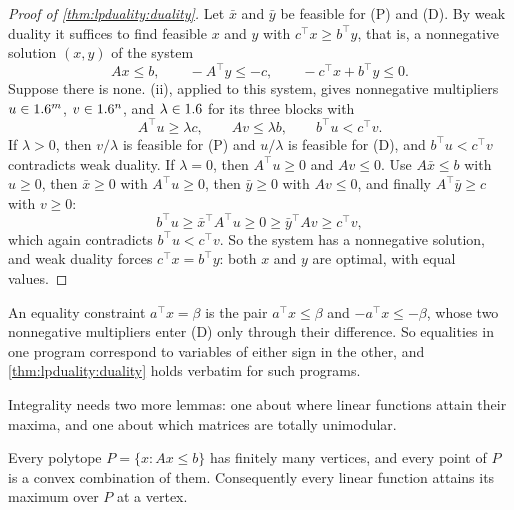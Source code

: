 \begin{refsection}
\begin{proof}[Proof of \cref{thm:lpduality:duality}]
Let $\bar x$ and $\bar y$ be feasible for (P) and (D). By weak duality it suffices to find feasible $x$ and $y$ with $c^\top x\ge b^\top y$, that is, a nonnegative solution $(x,y)$ of the system
\[
Ax\le b,\qquad -A^\top y\le -c,\qquad -c^\top x+b^\top y\le 0 .
\]
Suppose there is none. (ii), applied to this system, gives nonnegative multipliers $u\in1.6^m$, $v\in1.6^n$, and $\lambda\in1.6$ for its three blocks with
\[
A^\top u\ge\lambda c,\qquad Av\le\lambda b,\qquad b^\top u<c^\top v .
\]
If $\lambda>0$, then $v/\lambda$ is feasible for (P) and $u/\lambda$ is feasible for (D), and $b^\top u<c^\top v$ contradicts weak duality. If $\lambda=0$, then $A^\top u\ge0$ and $Av\le0$. Use $A\bar x\le b$ with $u\ge0$, then $\bar x\ge0$ with $A^\top u\ge0$, then $\bar y\ge0$ with $Av\le0$, and finally $A^\top\bar y\ge c$ with $v\ge0$:
\[
b^\top u\ge\bar x^\top A^\top u\ge0\ge\bar y^\top Av\ge c^\top v ,
\]
which again contradicts $b^\top u<c^\top v$. So the system has a nonnegative solution, and weak duality forces $c^\top x=b^\top y$: both $x$ and $y$ are optimal, with equal values.
\end{proof}

An equality constraint $a^\top x=\beta$ is the pair $a^\top x\le\beta$ and $-a^\top x\le-\beta$, whose two nonnegative multipliers enter (D) only through their difference. So equalities in one program correspond to variables of either sign in the other, and \cref{thm:lpduality:duality} holds verbatim for such programs.

Integrality needs two more lemmas: one about where linear functions attain their maxima, and one about which matrices are totally unimodular.

\begin{lemma}[Vertices]\label{lem:lpduality:vertices}
Every polytope $P=\{x:Ax\le b\}$ has finitely many vertices, and every point of $P$ is a convex combination of them. Consequently every linear function attains its maximum over $P$ at a vertex.
\end{lemma}


\end{refsection}
